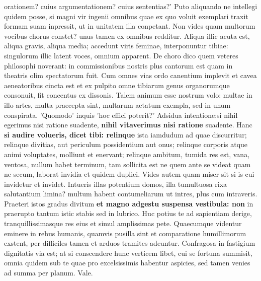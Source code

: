 orationem? cuius argumentationem? cuius sententias?' Puto aliquando ne intellegi quidem posse, si magni vir ingenii omnibus quae ex quo voluit exemplari traxit formam suam inpressit, ut in unitatem illa conpetant. Non vides quam multorum vocibus chorus constet? unus tamen ex omnibus redditur. Aliqua illic acuta est, aliqua gravis, aliqua media; accedunt viris feminae, interponuntur tibiae: singulorum illic latent voces, omnium apparent. De choro dico quem veteres philosophi noverant: in commissionibus nostris plus cantorum est quam in theatris olim spectatorum fuit. Cum omnes vias ordo canentium implevit et cavea aeneatoribus cincta est et ex pulpito omne tibiarum genus organorumque consonuit, fit concentus ex dissonis. Talem animum esse nostrum volo: multae in illo artes, multa praecepta sint, multarum aetatum exempla, sed in unum conspirata. 'Quomodo' inquis 'hoc effici poterit?' Adsidua intentione:si nihil egerimus nisi ratione suadente, \textbf{nihil vitaverimus nisi ratione} suadente. Hanc \textbf{si \textbf{audire volueris, dicet tibi: relinque}} ista iamdudum ad quae discurritur; relinque divitias, aut periculum possidentium aut onus; relinque corporis atque animi voluptates, molliunt et enervant; relinque ambitum, tumida res est, vana, ventosa, nullum habet terminum, tam sollicita est ne quem ante se videat quam ne secum, laborat invidia et quidem duplici. Vides autem quam miser sit si is cui invidetur et invidet. Intueris illas potentium domos, illa tumultuosa rixa salutantium limina? multum habent contumeliarum ut intres, plus cum intraveris. Praeteri istos gradus divitum \textbf{et magno adgestu suspensa vestibula: non} in praerupto tantum istic stabis sed in lubrico. Huc potius te ad sapientiam derige, tranquillissimasque res eius et simul amplissimas pete. Quaecumque videntur eminere in rebus humanis, quamvis pusilla sint et comparatione humillimorum exstent, per difficiles tamen et arduos tramites adeuntur. Confragosa in fastigium dignitatis via est; at si conscendere hunc verticem libet, cui se fortuna summisit, omnia quidem sub te quae pro excelsissimis habentur aspicies, sed tamen venies ad summa per planum. Vale. 

